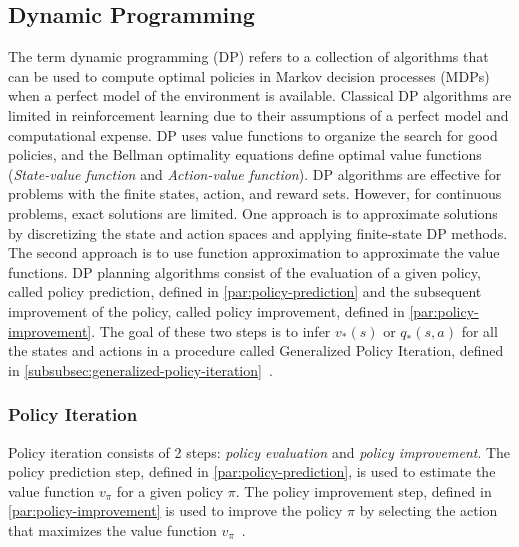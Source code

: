 \documentclass[../xlapes02]{subfiles}
\begin{document}
    \subsection{Dynamic Programming}\label{subsec:dynamic-programming}
    The term dynamic programming (DP) refers to a collection of algorithms that can be used to compute optimal policies in Markov decision processes (MDPs) when a perfect model of the environment is available. Classical DP algorithms are limited in reinforcement learning due to their assumptions of a perfect model and computational expense. DP uses value functions to organize the search for good policies, and the Bellman optimality equations define optimal value functions (\emph{State-value function} and \emph{Action-value function}). DP algorithms are effective for problems with the finite states, action, and reward sets. However, for continuous problems, exact solutions are limited. One approach is to approximate solutions by discretizing the state and action spaces and applying finite-state DP methods. The second approach is to use function approximation to approximate the value functions. DP planning algorithms consist of the evaluation of a given policy, called policy prediction, defined in \cref{par:policy-prediction} and the subsequent improvement of the policy, called policy improvement, defined in \cref{par:policy-improvement}. The goal of these two steps is to infer $v_*(s)$ or $q_*(s,a)$ for all the states and actions in a procedure called Generalized Policy Iteration, defined in \cref{subsubsec:generalized-policy-iteration}~\cite{sutton2018reinforcement, FITMT25127}.

    \subsubsection{Policy Iteration}\label{subsubsec:policy-iteration}
    Policy iteration consists of 2 steps: \emph{policy evaluation} and \emph{policy improvement}. The policy prediction step, defined in \cref{par:policy-prediction}, is used to estimate the value function $v_{\pi}$ for a given policy $\pi$. The policy improvement step, defined in \cref{par:policy-improvement} is used to improve the policy $\pi$ by selecting the action that maximizes the value function $v_{\pi}$~\cite{sutton2018reinforcement}.
\end{document}

